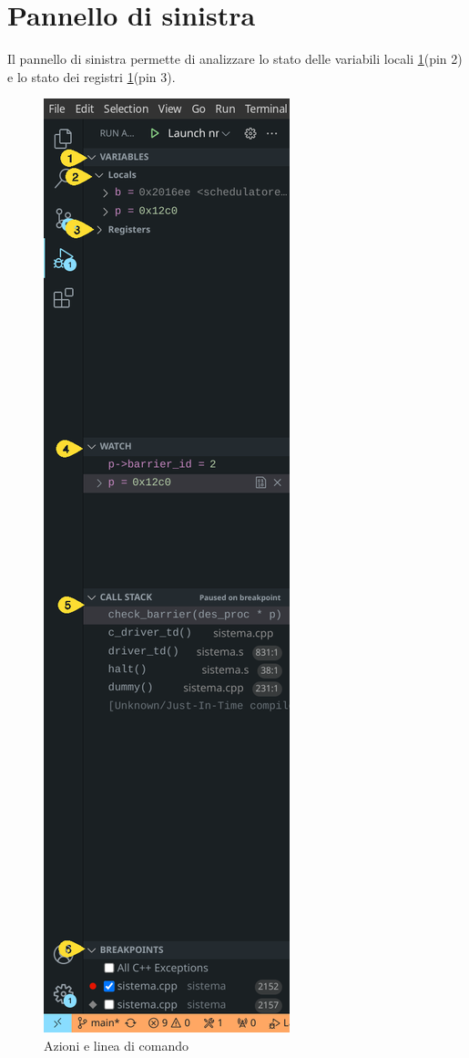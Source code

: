 \section{Pannello di sinistra}

Il pannello di sinistra permette di analizzare lo stato delle variabili locali \ref*{fig:leftDebug}(pin 2) e lo stato dei registri \ref*{fig:leftDebug}(pin 3).

\begin{figure}[H]
    \centering
    \includegraphics[height=0.4\pdfpageheight]{images/leftDebug.png}
    \caption{Azioni e linea di comando}
    \label{fig:leftDebug}
\end{figure}

